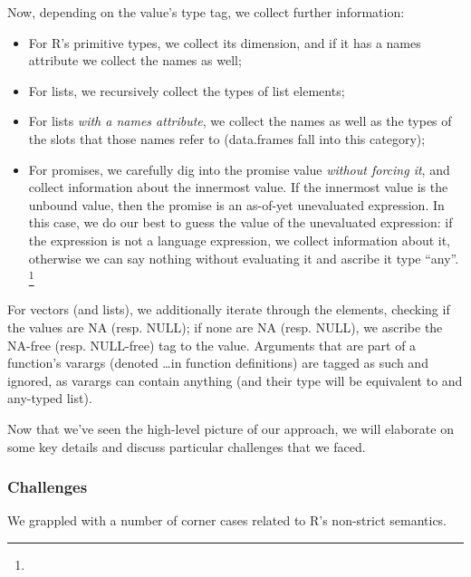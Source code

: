 \documentclass[acmsmall,review,anonymous]{acmart}\settopmatter{printfolios=true,printccs=false,printacmref=false}
\begin{document}
Now, depending on the value's type tag, we collect further information:

\begin{itemize}
\item For R's primitive types, we collect its dimension, and if it has a
  names attribute we collect the names as well;
\item For lists, we recursively collect the types of list elements;
\item For lists {\it with a names attribute}, we collect the names as well
  as the types of the slots that those names refer to (data.frames fall into
  this category);
\item For promises, we carefully dig into the promise value {\it without
  forcing it}, and collect information about the innermost value. If the
  innermost value is the unbound value, then the promise is an as-of-yet
  unevaluated expression. In this case, we do our best to guess the value of
  the unevaluated expression: if the expression is not a language
  expression, we collect information about it, otherwise we can say nothing
  without evaluating it and ascribe it type ``any''. \footnote{}
\end{itemize}

For vectors (and lists), we additionally iterate through the elements,
checking if the values are NA (resp. NULL); if none are NA (resp. NULL), we
ascribe the NA-free (resp. NULL-free) tag to the value.  Arguments that are
part of a function's varargs (denoted \ldots in function definitions) are
tagged as such and ignored, as varargs can contain anything (and their type
will be equivalent to and any-typed list).

Now that we've seen the high-level picture of our approach, we will elaborate on some key details and discuss particular challenges that we faced.

%
%
\subsubsection{Challenges}
\label{subsec:typetracer-challenges}

We grappled with a number of corner cases related to R's non-strict semantics.
\end{document}

